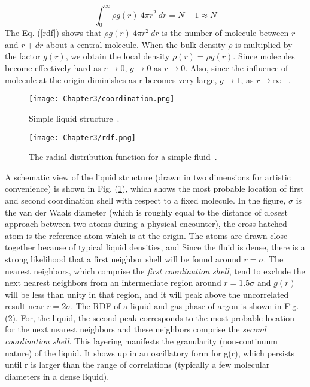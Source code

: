 \begin{sloppypar}
\begin{equation}\label{rdf}
\int_0^\infty \rho g(r)~4\pi r^2~dr = N-1 \approx N
\end{equation}
The Eq. (\ref{rdf}) shows that $\rho g(r)~4\pi r^2~dr $   is the number of
molecule between $r$ and $r + dr$ about a central molecule. When the bulk density $\rho$ is multiplied by the factor $g(r)$, we obtain the  local density $\rho(r) = \rho g(r)$. Since molecules become effectively hard  as $r \longrightarrow 0$, $g \longrightarrow 0$ as $r \longrightarrow 0$. Also, since the influence of molecule at the origin diminishes as r becomes very large, $g \longrightarrow 1$, as $r \longrightarrow \infty$ ~\citep{mcquarrie2000}.
\begin{figure}[h!]
\centering
\texttt{[image: Chapter3/coordination.png]}
\caption {Simple liquid structure~\citep{chandler1987}.} 
\label{coordinationfig} 
\end{figure}
\begin{figure}[h!]
\centering
\texttt{[image: Chapter3/rdf.png]}
\caption {The radial distribution function for a simple fluid~\citep{chandler1987}.} 
\label{rdffig} 
\end{figure}
 A schematic view of the liquid structure (drawn in two dimensions for artistic convenience) is shown in Fig. (\ref{coordinationfig}), which shows the most probable location of first and second coordination shell with respect to a fixed molecule. In the figure, $\sigma$ is the van der Waals diameter (which is roughly equal to  the distance of closest approach between two atoms during a physical  encounter), the cross-hatched atom is the reference atom which is at the origin. The atoms are drawn close  together because of typical liquid densities, and  Since the fluid is  dense, there is a strong likelihood that a first neighbor shell will be  found around $r = \sigma$. The nearest neighbors, which comprise the \textit{first  coordination shell}, tend to exclude the next nearest neighbors from
 an intermediate region around $r = 1.5 \sigma$ and  $g(r)$ will be less than 
 unity in that region, and it will peak above the uncorrelated result 
 near $r = 2\sigma$. The RDF of a liquid and gas phase of argon is shown in Fig. (\ref{rdffig}). For, the  liquid, the second peak corresponds to the most probable
 location for the next nearest neighbors and these neighbors comprise  the \textit{second coordination shell}. This layering manifests the granularity  (non-continuum nature) of the liquid. It shows up in an oscillatory  form for g(r), which persists until r is larger than the range of  correlations (typically a few molecular diameters in a dense liquid). 

\end{sloppypar}
